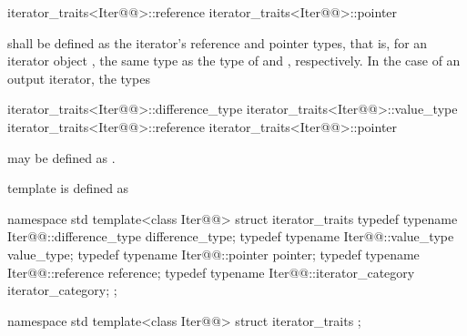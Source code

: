 \documentclass[american,twoside]{book}
\begin{document}
\begin{codeblock}
iterator_traits<Iter@@>::reference
iterator_traits<Iter@@>::pointer
\end{codeblock}

shall be defined as the iterator's reference and pointer types, that is, for an
iterator object , the same type as the type of  and ,
respectively. In the case of an output iterator, the types

\begin{codeblock}
iterator_traits<Iter@@>::difference_type
iterator_traits<Iter@@>::value_type
iterator_traits<Iter@@>::reference
iterator_traits<Iter@@>::pointer
\end{codeblock}

may be defined as .

\pnum
{}

\setcounter{Paras}{1}
\pnum
{}
template  is defined as 
\begin{itemdecl}
namespace std { 
  template<class Iter@@> struct iterator_traits { 
    typedef typename Iter@@::difference_type   difference_type; 
    typedef typename Iter@@::value_type        value_type; 
    typedef typename Iter@@::pointer           pointer; 
    typedef typename Iter@@::reference         reference; 
    typedef typename Iter@@::iterator_category iterator_category; 
  }; 
} 
\end{itemdecl}
\color{addclr}
\begin{itemdecl}
namespace std { 
  template<class Iter@@> struct iterator_traits { };
}
\end{itemdecl}
\color{black}
\end{document}
